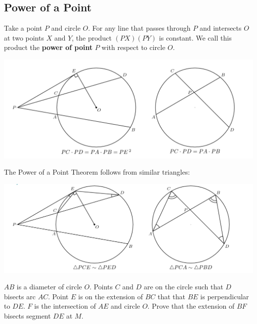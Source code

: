 \documentclass[12pt]{scrartcl}
\newcommand{\<}{\langle}
\renewcommand{\>}{\rangle}
\begin{document}
\subsection{Power of a Point}
\begin{thm} Take a point $P$ and circle $O$.  For any line that passes through $P$ and intersects $O$ at two points $X$ and $Y$, the product $(PX)(PY)$ is constant.  We call this product the \textbf{power of point} $P$ with respect to circle $O$.  
 \end{thm}
 \begin{center}
\includegraphics[scale=0.8]{graphics/pop.png}
\end{center}
The Power of a Point Theorem follows from similar triangles:
\begin{center}
\includegraphics[scale=0.4]{graphics/popproof.png}
\end{center}
\begin{Prob} $AB$ is a diameter of circle $O$. Points $C$ and $D$ are on the circle such that $D$ bisects arc $AC$.  Point $E$ is on the extension of $BC$ that that $BE$ is perpendicular to $DE$.  $F$ is the intersection of $AE$ and circle $O$.  Prove that the extension of $BF$ bisects segment $DE$ at $M$. 
\end{Prob}
\end{document}
